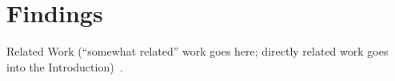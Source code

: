 \section{Findings}
\label{sec:relwork}

Related Work (``somewhat related'' work goes here; directly related work
goes into the Introduction)~\cite{dsd13}.

